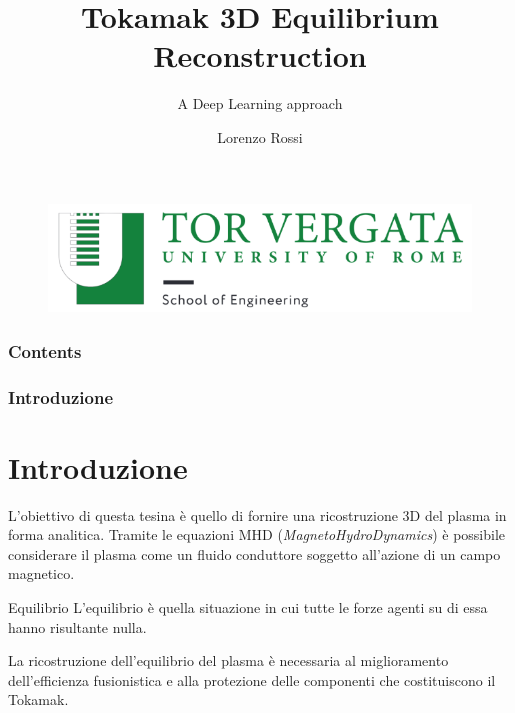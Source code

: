 \documentclass{beamer}
\title{Tokamak 3D Equilibrium Reconstruction}
\subtitle{A Deep Learning approach}
\author{Lorenzo Rossi}
\institute{Università di Rome "Tor Vergata"} %
\begin{document}
\begin{frame}
	\titlepage{}
	\vspace{-1cm}
	\begin{figure}
		\centering
		\includegraphics[scale=0.3]{2022-06-06-23-17-53.png}%
	\end{figure}
\end{frame}
\begin{frame}
	\frametitle{Contents}
	\tableofcontents
\end{frame}
\begin{frame}
	\frametitle{Introduzione}
	\section{Introduzione}
	L'obiettivo di questa tesina è quello di fornire una ricostruzione 3D del plasma in forma analitica.
	Tramite le equazioni MHD (\emph{MagnetoHydroDynamics}) è possibile considerare il plasma come un fluido conduttore soggetto all'azione di un campo magnetico.
	\begin{block}{Equilibrio}
		L'equilibrio è quella situazione in cui tutte le forze agenti su di essa hanno risultante nulla.
	\end{block}
	La ricostruzione dell'equilibrio del plasma è necessaria al miglioramento dell'efficienza fusionistica e alla protezione delle componenti che costituiscono il Tokamak.
\end{frame}

\end{document}

